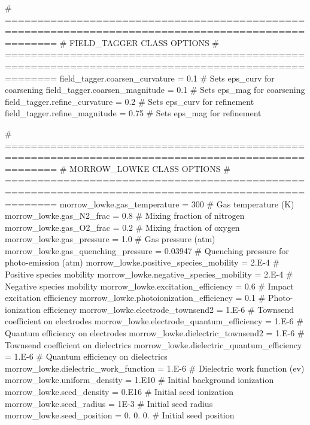 \begin{DoxyVerb}
  # ====================================================================================================
  # FIELD_TAGGER CLASS OPTIONS
  # ====================================================================================================
  field_tagger.coarsen_curvature = 0.1    # Sets eps_curv for coarsening
  field_tagger.coarsen_magnitude = 0.1    # Sets eps_mag for coarsening 
  field_tagger.refine_curvature  = 0.2    # Sets eps_curv for refinement
  field_tagger.refine_magnitude  = 0.75   # Sets eps_mag for refinement

  # ====================================================================================================
  # MORROW_LOWKE CLASS OPTIONS
  # ====================================================================================================
  morrow_lowke.gas_temperature               = 300                   # Gas temperature (K)
  morrow_lowke.gas_N2_frac                   = 0.8                   # Mixing fraction of nitrogen
  morrow_lowke.gas_O2_frac                   = 0.2                   # Mixing fraction of oxygen
  morrow_lowke.gas_pressure                  = 1.0                   # Gas pressure (atm)
  morrow_lowke.gas_quenching_pressure        = 0.03947               # Quenching pressure for photo-emission (atm)
  morrow_lowke.positive_species_mobility     = 2.E-4                 # Positive species mobility
  morrow_lowke.negative_species_mobility     = 2.E-4                 # Negative species mobility
  morrow_lowke.excitation_efficiency         = 0.6                   # Impact excitation efficiency
  morrow_lowke.photoionization_efficiency    = 0.1                   # Photo-ionization efficiency
  morrow_lowke.electrode_townsend2           = 1.E-6                 # Townsend coefficient on electrodes
  morrow_lowke.electrode_quantum_efficiency  = 1.E-6                 # Quantum efficiency on electrodes
  morrow_lowke.dielectric_townsend2          = 1.E-6                 # Townsend coefficient on dielectrics
  morrow_lowke.dielectric_quantum_efficiency = 1.E-6                 # Quantum efficiency on dielectrics
  morrow_lowke.dielectric_work_function      = 1.E-6                 # Dielectric work function (ev)
  morrow_lowke.uniform_density               = 1.E10                 # Initial background ionization
  morrow_lowke.seed_density                  = 0.E16                 # Initial seed ionization
  morrow_lowke.seed_radius                   = 1E-3                  # Initial seed radius
  morrow_lowke.seed_position                 = 0. 0. 0.              # Initial seed position

\end{DoxyVerb}
